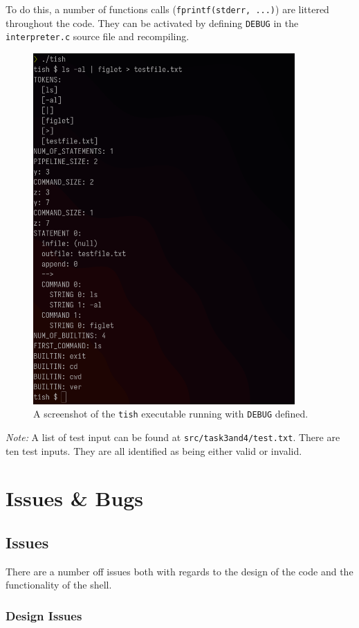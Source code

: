 \documentclass[12pt]{article}
\begin{document}
To do this, a number of functions calls (\texttt{fprintf(stderr,
...)}) are littered throughout the code. They can be activated
by defining \texttt{DEBUG} in the \texttt{interpreter.c} source
file and recompiling.

\begin{figure}[H]
\centering
\includegraphics[width=10cm]{task3and4-test}
\caption{A screenshot of the \texttt{tish} executable running
with \texttt{DEBUG} defined.}
\end{figure}

\textit{Note:} A list of test input can be found at
\texttt{src/task3and4/test.txt}. There are ten test inputs. They
are all identified as being either valid or invalid.

\section{Issues \& Bugs}

\subsection{Issues}

There are a number off issues both with regards to the design of
the code and the functionality of the shell.

\subsubsection{Design Issues}
\end{document}
